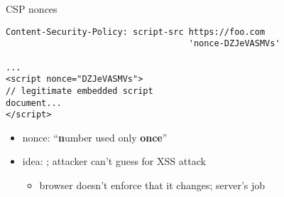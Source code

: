\begin{frame}[fragile,label=CSPNonces]{CSP nonces}
\begin{verbatim}
Content-Security-Policy: script-src https://foo.com
                                    'nonce-DZJeVASMVs'

...
<script nonce="DZJeVASMVs">
// legitimate embedded script
document...
</script>
\end{verbatim}
    \begin{itemize}
    \item nonce: ``\textbf{n}umber used only \textbf{once}''
    \item idea: ; attacker can't guess for XSS attack
        \begin{itemize}
        \item browser doesn't enforce that it changes; server's job
        \end{itemize}
    \end{itemize}
\end{frame}
